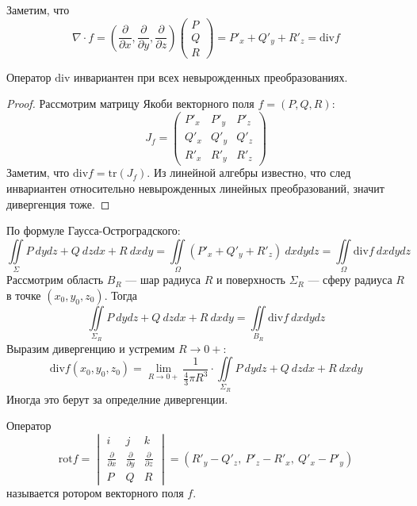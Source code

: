 \begin{comm}
    Заметим, что 
    \[\nabla\cdot f=\left(\frac{\partial}{\partial x}, \frac{\partial}{\partial y}, \frac{\partial}{\partial z}\right)\begin{pmatrix}
        P\\
        Q\\
        R
    \end{pmatrix}=P'_x+Q'_y+R'_z=\text{div} f\]
\end{comm}
\begin{statement}
    Оператор $\text{div}$ инвариантен при всех невырожденных преобразованиях.
\end{statement}
\begin{proof}
    Рассмотрим матрицу Якоби векторного поля $f=(P,Q,R)$:
    \[J_f=\begin{pmatrix}
        P'_x & P'_y & P'_z\\
        Q'_x & Q'_y & Q'_z\\
        R'_x & R'_y & R'_z
    \end{pmatrix}\]
    Заметим, что $\text{div}f=\text{tr}(J_f)$. Из линейной алгебры известно, что след инвариантен относительно невырожденных линейных преобразований, значит дивергенция тоже.
\end{proof}
\begin{comm}
    По формуле Гаусса-Остроградского:
    \[\iint\limits_{\Sigma}P\ dydz+Q\ dzdx+ R\ dxdy=\iint\limits_{\Omega}(P'_x+Q'_y+R'_z)\ dxdydz=\iint\limits_{\Omega}\text{div}f\ dxdydz\]
    Рассмотрим область $B_R$ --- шар радиуса $R$ и поверхность $\Sigma_R$ --- сферу радиуса $R$ в точке $(x_0,y_0,z_0)$. Тогда
    \[\iint\limits_{\Sigma_R}P\ dydz+Q\ dzdx+ R\ dxdy=\iint\limits_{B_R}\text{div}f\ dxdydz\] 
    Выразим дивергенцию и устремим $R\to 0+$:
    \[\text{div}f(x_0,y_0,z_0)=\lim\limits_{R\to 0+}\frac{1}{\frac{4}{3} \pi R^3}\cdot \iint\limits_{\Sigma_R}P\ dydz+ Q\ dzdx+R\ dxdy\]
    Иногда это берут за определние дивергенции.
\end{comm}
\begin{definition}
    Оператор
    \[\text{rot}f=\begin{vmatrix}
        i & j & k\\
        \frac{\partial}{\partial x} & \frac{\partial}{\partial y} & \frac{\partial}{\partial z}\\
        P & Q & R
    \end{vmatrix}=\left(R'_y-Q'_z,\ P'_z-R'_x,\ Q'_x-P'_y\right)\]
    называется ротором векторного поля $f$.
\end{definition}

